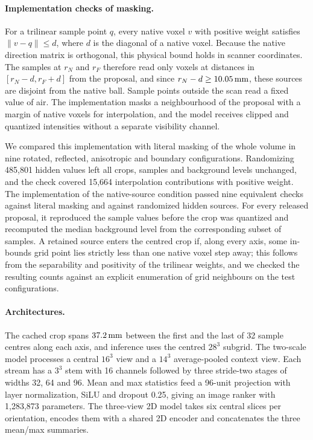 \paragraph{Implementation checks of masking.}
For a trilinear sample point $q$, every native voxel $v$ with positive weight satisfies $\lVert v-q\rVert\leq d$, where $d$ is the diagonal of a native voxel. Because the native direction matrix is orthogonal, this physical bound holds in scanner coordinates. The samples at $r_N$ and $r_F$ therefore read only voxels at distances in $[r_N-d,r_F+d]$ from the proposal, and since $r_N-d\geq10.05\,\mathrm{mm}$, these sources are disjoint from the native ball. Sample points outside the scan read a fixed value of air. The implementation masks a neighbourhood of the proposal with a margin of native voxels for interpolation, and the model receives clipped and quantized intensities without a separate visibility channel.

We compared this implementation with literal masking of the whole volume in nine rotated, reflected, anisotropic and boundary configurations. Randomizing 485,801 hidden values left all crops, samples and background levels unchanged, and the check covered 15,664 interpolation contributions with positive weight. The implementation of the native-source condition passed nine equivalent checks against literal masking and against randomized hidden sources. For every released proposal, it reproduced the sample values before the crop was quantized and recomputed the median background level from the corresponding subset of samples. A retained source enters the centred crop if, along every axis, some in-bounds grid point lies strictly less than one native voxel step away; this follows from the separability and positivity of the trilinear weights, and we checked the resulting counts against an explicit enumeration of grid neighbours on the test configurations.

\paragraph{Architectures.}
The cached crop spans $37.2\,\mathrm{mm}$ between the first and the last of 32 sample centres along each axis, and inference uses the centred $28^3$ subgrid. The two-scale model processes a central $16^3$ view and a $14^3$ average-pooled context view. Each stream has a $3^3$ stem with 16 channels followed by three stride-two stages of widths 32, 64 and 96. Mean and max statistics feed a 96-unit projection with layer normalization, SiLU and dropout 0.25, giving an image ranker with 1,283,873 parameters. The three-view 2D model takes six central slices per orientation, encodes them with a shared 2D encoder and concatenates the three mean/max summaries.


